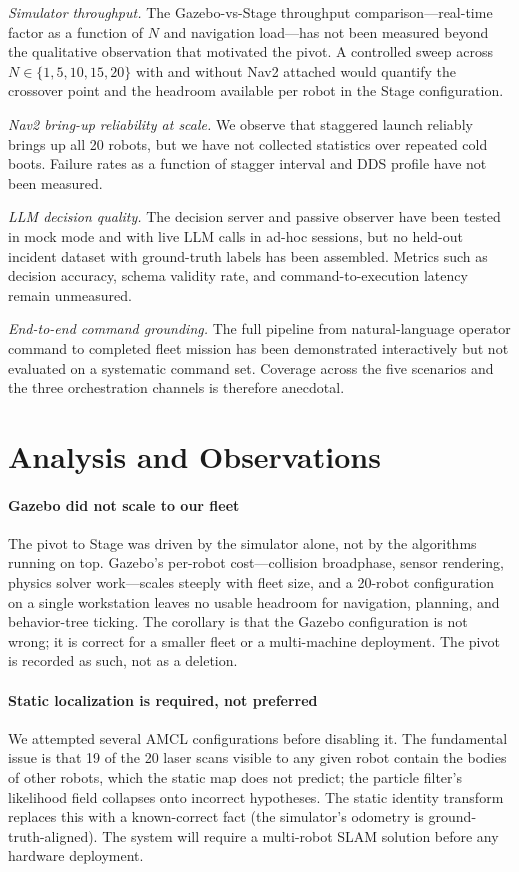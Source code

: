 \documentclass[conference]{IEEEtran}
\begin{document}
\textit{Simulator throughput.} The Gazebo-vs-Stage throughput
comparison---real-time factor as a function of $N$ and
navigation load---has not been measured beyond the qualitative
observation that motivated the pivot. A controlled sweep
across $N \in \{1,5,10,15,20\}$ with and without Nav2
attached would quantify the crossover point and the headroom
available per robot in the Stage configuration.

\textit{Nav2 bring-up reliability at scale.} We observe that
staggered launch reliably brings up all 20 robots, but we
have not collected statistics over repeated cold boots.
Failure rates as a function of stagger interval and DDS
profile have not been measured.

\textit{LLM decision quality.} The decision server and
passive observer have been tested in mock mode and with
live LLM calls in ad-hoc sessions, but no held-out incident
dataset with ground-truth labels has been assembled. Metrics
such as decision accuracy, schema validity rate, and
command-to-execution latency remain unmeasured.

\textit{End-to-end command grounding.} The full pipeline from
natural-language operator command to completed fleet mission
has been demonstrated interactively but not evaluated on a
systematic command set. Coverage across the five scenarios
and the three orchestration channels is therefore anecdotal.

\section{Analysis and Observations}
\label{sec:analysis}

\paragraph{Gazebo did not scale to our fleet}
The pivot to Stage was driven by the simulator alone, not by
the algorithms running on top. Gazebo's per-robot
cost---collision broadphase, sensor rendering, physics solver
work---scales steeply with fleet size, and a 20-robot
configuration on a single workstation leaves no usable
headroom for navigation, planning, and behavior-tree ticking.
The corollary is that the Gazebo configuration is not wrong;
it is correct for a smaller fleet or a multi-machine
deployment. The pivot is recorded as such, not as a deletion.

\paragraph{Static localization is required, not preferred}
We attempted several AMCL configurations before disabling it.
The fundamental issue is that 19 of the 20 laser scans visible
to any given robot contain the bodies of other robots, which
the static map does not predict; the particle filter's
likelihood field collapses onto incorrect hypotheses. The
static identity transform replaces this with a
known-correct fact (the simulator's odometry is
ground-truth-aligned). The system will require a multi-robot
SLAM solution before any hardware deployment.
\end{document}
